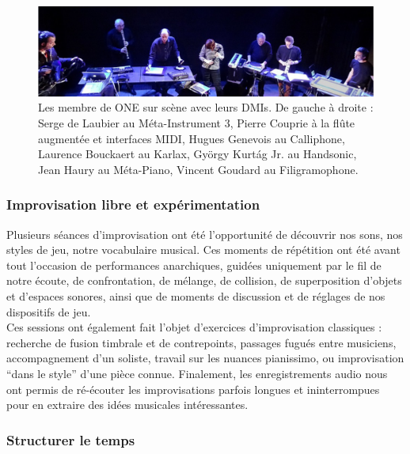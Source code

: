 \begin{figure}[!htbp]
	\captionsetup{format=plain}%
	\includegraphics[width=\textwidth]{gfx/notation/ONE-fullBand.png}
	\caption[Les membres de ONE et leurs DMIs]{Les membre de ONE sur scène avec leurs \glspl{DMI}. De gauche à droite : Serge de Laubier au Méta-Instrument 3, Pierre Couprie à la flûte augmentée et interfaces MIDI, Hugues Genevois au Calliphone, Laurence Bouckaert au Karlax, György Kurtág Jr. au Handsonic, Jean Haury au Méta-Piano, Vincent Goudard au Filigramophone.}
	\label{fig:notation:one-fullband}
\end{figure}

\subsubsection{Improvisation libre et expérimentation}

\noindent Plusieurs séances d'improvisation ont été l'opportunité de découvrir nos sons, nos styles de jeu, notre vocabulaire musical. Ces moments de répétition ont été avant tout l'occasion de performances anarchiques, guidées uniquement par le fil de notre écoute, de confrontation, de mélange, de collision, de superposition d'objets et d'espaces sonores, ainsi que de moments de discussion et de réglages de nos dispositifs de jeu.\\
\indent Ces sessions ont également fait l'objet d'exercices d'improvisation classiques : recherche de fusion timbrale et de contrepoints, passages fugués entre musiciens, accompagnement d'un soliste, travail sur les nuances pianissimo, ou improvisation ``dans le style'' d'une pièce connue. Finalement, les enregistrements audio nous ont permis de ré-écouter les improvisations parfois longues et ininterrompues pour en extraire des idées musicales intéressantes.\\

\subsubsection{Structurer le temps}

